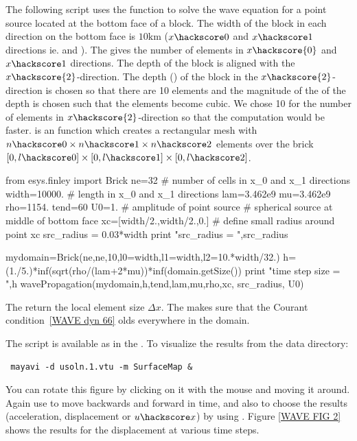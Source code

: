 The following script uses the  function to solve the
wave equation for a point source located at the bottom face of a block. The width of the block in 
each direction on the bottom face is $10\mbox{km}$ ($x\hackscore 0$ and $x\hackscore 1$ directions ie.  and ).
The  gives the number of elements in $x\hackscore{0}$ and $x\hackscore 1$ directions.  
The depth of the block is aligned with the $x\hackscore{2}$-direction. 
The depth () of the block in
the $x\hackscore{2}$-direction is chosen so that there are 10 elements and the magnitude of the
of the depth is chosen such that the elements 
become cubic. We chose 10 for the number of elements in $x\hackscore{2}$-direction so that the 
computation would be faster.  is an \finley function which creates a rectangular mesh 
with $n\hackscore 0 \times n\hackscore 1 \times n\hackscore2$ elements over the brick $[0,l\hackscore 0] \times [0,l\hackscore 1] \times [0,l\hackscore 2]$.
\begin{python}
from esys.finley import Brick
ne=32          # number of cells in x_0 and x_1 directions
width=10000.  # length in x_0 and x_1 directions
lam=3.462e9
mu=3.462e9
rho=1154.
tend=60
U0=1. # amplitude of point source
# spherical source at middle of bottom face
xc=[width/2.,width/2.,0.]
# define small radius around point xc
src_radius = 0.03*width
print "src_radius = ",src_radius

mydomain=Brick(ne,ne,10,l0=width,l1=width,l2=10.*width/32.)
h=(1./5.)*inf(sqrt(rho/(lam+2*mu))*inf(domain.getSize())
print "time step size = ",h
wavePropagation(mydomain,h,tend,lam,mu,rho,xc, src_radius, U0)
\end{python}
The  return the local element size $\Delta x$. The 
 makes sure that the Courant condition~\ref{WAVE dyn 66} olds everywhere in the domain. 

The script is available as  in the \ExampleDirectory {}. 
To visualize the results from the data directory: 
\begin{verbatim} mayavi -d usoln.1.vtu -m SurfaceMap &\end{verbatim} You can rotate this figure by clicking on it with the mouse and moving it around.
Again use  to move backwards and forward in time, and 
also to choose the results (acceleration, displacement or $u\hackscore x$) by using . Figure \ref{WAVE FIG 2} shows the results for the displacement at various time steps.

